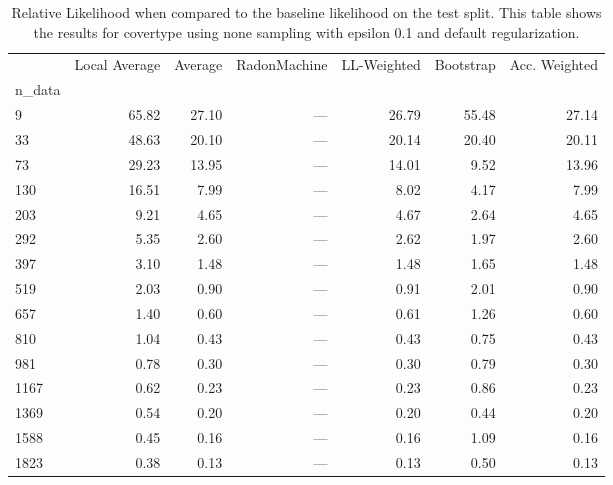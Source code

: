 \begin{table}
\centering
\caption{Relative Likelihood when compared to the baseline likelihood on the test split. This table shows the results for  covertype using  none sampling with epsilon  0.1 and  default regularization.}
\label{tab:1}
\begin{tabular}{lrrrrrr}
\toprule
{} &  Local Average &  Average &  RadonMachine &  LL-Weighted &  Bootstrap &  Acc. Weighted \\
n\_data &                &          &               &              &            &                \\
\midrule
9      &          65.82 &    27.10 &           --- &        26.79 &      55.48 &          27.14 \\
33     &          48.63 &    20.10 &           --- &        20.14 &      20.40 &          20.11 \\
73     &          29.23 &    13.95 &           --- &        14.01 &       9.52 &          13.96 \\
130    &          16.51 &     7.99 &           --- &         8.02 &       4.17 &           7.99 \\
203    &           9.21 &     4.65 &           --- &         4.67 &       2.64 &           4.65 \\
292    &           5.35 &     2.60 &           --- &         2.62 &       1.97 &           2.60 \\
397    &           3.10 &     1.48 &           --- &         1.48 &       1.65 &           1.48 \\
519    &           2.03 &     0.90 &           --- &         0.91 &       2.01 &           0.90 \\
657    &           1.40 &     0.60 &           --- &         0.61 &       1.26 &           0.60 \\
810    &           1.04 &     0.43 &           --- &         0.43 &       0.75 &           0.43 \\
981    &           0.78 &     0.30 &           --- &         0.30 &       0.79 &           0.30 \\
1167   &           0.62 &     0.23 &           --- &         0.23 &       0.86 &           0.23 \\
1369   &           0.54 &     0.20 &           --- &         0.20 &       0.44 &           0.20 \\
1588   &           0.45 &     0.16 &           --- &         0.16 &       1.09 &           0.16 \\
1823   &           0.38 &     0.13 &           --- &         0.13 &       0.50 &           0.13 \\
\bottomrule
\end{tabular}
\end{table}
